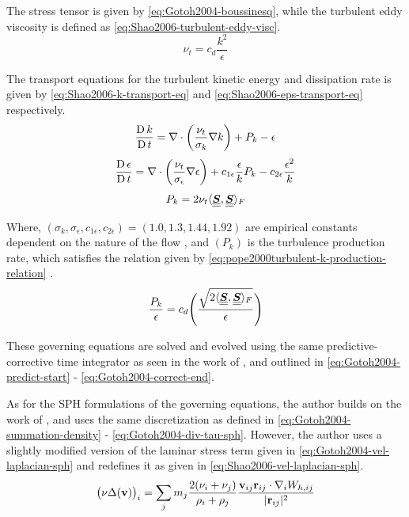 The stress tensor is given by \ref{eq:Gotoh2004-boussinesq}, while the turbulent eddy viscosity is defined as \ref{eq:Shao2006-turbulent-eddy-visc}.
\begin{equation}
	\nu_t = c_d \frac{k^2}{\epsilon}
	\label{eq:Shao2006-turbulent-eddy-visc}
\end{equation}

The transport equations for the turbulent kinetic energy and dissipation rate is given by \ref{eq:Shao2006-k-transport-eq} and \ref{eq:Shao2006-eps-transport-eq} respectively.
\begin{equation}
	\frac{\operatorname{D} k}{\operatorname{D} t} = \nabla \cdot \bigg( \frac{\nu_t}{\sigma_k} \nabla k \bigg) + P_k - \epsilon
	\label{eq:Shao2006-k-transport-eq}
\end{equation}
\begin{equation}
	\frac{\operatorname{D} \epsilon}{\operatorname{D} t} = \nabla \cdot \bigg( \frac{\nu_t}{\sigma_{\epsilon}} \nabla \epsilon \bigg) + c_{1\epsilon} \frac{\epsilon}{k} P_k - c_{2\epsilon} \frac{\epsilon^2}{k}
	\label{eq:Shao2006-eps-transport-eq}
\end{equation}
\begin{equation}
	P_k = 2\nu_t \langle \underline{\underline{\bm{S}}}, \underline{\underline{\bm{S}}} \rangle_F
	\label{eq:Shao2006-k-production-term}
\end{equation}

Where, $(\sigma_k, \sigma_{\epsilon}, c_{1\epsilon}, c_{2\epsilon}) = (1.0, 1.3, 1.44, 1.92)$ are empirical constants dependent on the nature of the flow , and $(P_k)$ is the turbulence production rate, which satisfies the relation given by \ref{eq:pope2000turbulent-k-production-relation} \parencite{pope2000turbulent}.
\begin{equation}
	\frac{P_k}{\epsilon} = c_d \Bigg( \frac{\sqrt{2 \langle \underline{\underline{\bm{S}}}, \underline{\underline{\bm{S}}} \rangle_F}}{\epsilon} \Bigg)
	\label{eq:pope2000turbulent-k-production-relation}
\end{equation}

These governing equations are solved and evolved using the same predictive-corrective time integrator as seen in the work of \parencite{Gotoh2004}, and outlined in \ref{eq:Gotoh2004-predict-start} - \ref{eq:Gotoh2004-correct-end}.

As for the SPH formulations of the governing equations, the author builds on the work of \parencite{Gotoh2004}, and uses the same discretization as defined in \ref{eq:Gotoh2004-summation-density} - \ref{eq:Gotoh2004-div-tau-sph}. However, the author uses a slightly modified version of the laminar stress term given in \ref{eq:Gotoh2004-vel-laplacian-sph} and redefines it as given in \ref{eq:Shao2006-vel-laplacian-sph}.
\begin{equation}
	\big(\nu \Delta(\mathbf{v}) \big)_i = \sum_j m_j \frac{2 ( \nu_i + \nu_j ) }{ \rho_i + \rho_j }\frac{\mathbf{v}_{ij} \mathbf{r}_{ij} \cdot \nabla_{i} W_{h, ij}}{|\mathbf{r}_{ij}|^{2}}
	\label{eq:Shao2006-vel-laplacian-sph}
\end{equation}

